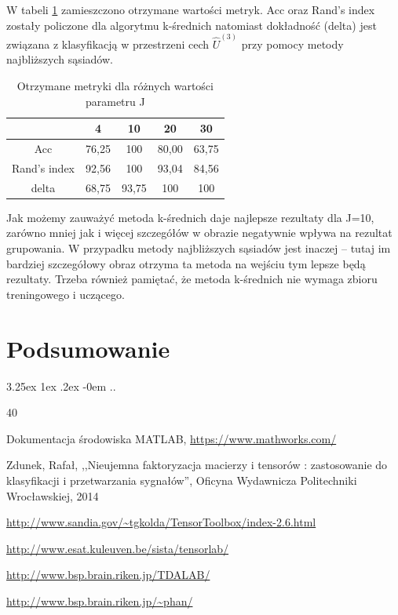 \documentclass[11pt, a4paper]{article}
\makeatletter
\newcommand{\fbi}{\leavevmode{\parindent=1em\indent}}
\renewcommand\paragraph{\@startsection{paragraph}{5}{\z@}
  {3.25ex \@plus1ex \@minus.2ex}
  {-0em}
  {\normalfont\normalsize\bfseries}}
\makeatother
\begin{document}
\fbi
W tabeli \ref{tab:wynikiOgolne} zamieszczono otrzymane wartości metryk. Acc oraz Rand's index zostały policzone dla algorytmu k-średnich natomiast dokładność (delta) jest związana z klasyfikacją w przestrzeni cech $\widehat{U}^{(3)}$ przy pomocy metody najbliższych sąsiadów.

\begin{table}[H]
	\centering
	\caption{Otrzymane metryki dla różnych wartości parametru J}
	\begin{tabular}{|c|c|c|c|c|}
		\hline 
		 & 4 & 10 & 20 & 30 \\ 
		\hline
		Acc & 76,25 & 100 & 80,00 & 63,75 \\
		\hline
		Rand's index & 92,56 & 100 & 93,04 & 84,56 \\
		\hline
		delta & 68,75 & 93,75 & 100 & 100 \\
		\hline
	\end{tabular}
	\label{tab:wynikiOgolne}
\end{table}

\fbi
Jak możemy zauważyć metoda k-średnich daje najlepsze rezultaty dla J=10, zarówno mniej jak i więcej szczegółów w obrazie negatywnie wpływa na rezultat grupowania. W przypadku metody najbliższych sąsiadów jest inaczej -- tutaj im bardziej szczegółowy obraz otrzyma ta metoda na wejściu tym lepsze będą rezultaty. Trzeba również pamiętać, że metoda k-średnich nie wymaga zbioru treningowego i uczącego.

\section{Podsumowanie}
\paragraph{}
..

\newpage
\begin{thebibliography}{40}

Dokumentacja środowiska MATLAB,
\url{https://www.mathworks.com/}

Zdunek, Rafał, ,,Nieujemna faktoryzacja macierzy i tensorów : zastosowanie do klasyfikacji i przetwarzania sygnałów'', Oficyna Wydawnicza Politechniki Wrocławskiej, 2014

\url{http://www.sandia.gov/~tgkolda/TensorToolbox/index-2.6.html}

\url{http://www.esat.kuleuven.be/sista/tensorlab/}

\url{http://www.bsp.brain.riken.jp/TDALAB/}

\url{http://www.bsp.brain.riken.jp/~phan/}

\end{thebibliography}
\end{document}
